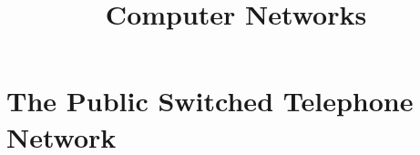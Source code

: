 \documentclass{article}
\title{Computer Networks}
\author{}
\date{}
\def\biblio{}
\begin{document}
\def\biblio{}
\maketitle

%

%

\section{The Public Switched Telephone Network}


%


\end{document}
